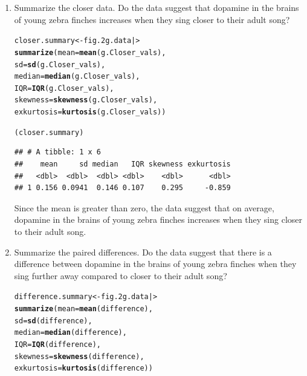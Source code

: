 \documentclass{article}\usepackage[]{graphicx}\usepackage[]{xcolor}
\makeatletter
\newcommand{\hldef}[1]{\textcolor[rgb]{0.345,0.345,0.345}{#1}}%
\newcommand{\hlkwb}[1]{\textcolor[rgb]{0.69,0.353,0.396}{#1}}%
\newcommand{\hlkwc}[1]{\textcolor[rgb]{0.333,0.667,0.333}{#1}}%
\newcommand{\hlkwd}[1]{\textcolor[rgb]{0.737,0.353,0.396}{\textbf{#1}}}%
\newenvironment{kframe}{%
 \def\at@end@of@kframe{}%
 \ifinner\ifhmode%
  \def\at@end@of@kframe{\end{minipage}}%
  \begin{minipage}{\columnwidth}%
 \fi\fi%
 \def\FrameCommand##1{\hskip\@totalleftmargin \hskip-\fboxsep
 \colorbox{shadecolor}{##1}\hskip-\fboxsep
     \hskip-\linewidth \hskip-\@totalleftmargin \hskip\columnwidth}%
 \MakeFramed {\advance\hsize-\width
   \@totalleftmargin\z@ \linewidth\hsize
   \@setminipage}}%
 {\par\unskip\endMakeFramed%
 \at@end@of@kframe}
\newenvironment{knitrout}{}{} %
\makeatother
\begin{document}
\begin{enumerate}
\begin{enumerate}
   \item Summarize the closer data. Do the data suggest that
   dopamine in the brains of young zebra finches increases when
   they sing closer to their adult song?

\begin{knitrout}\scriptsize
{}\color{fgcolor}\begin{kframe}
\begin{alltt}
\hldef{closer.summary} \hlkwb{<-} \hldef{fig.2g.data |>}
  \hlkwd{summarize}\hldef{(}\hlkwc{mean}       \hldef{=} \hlkwd{mean}\hldef{(g.Closer_vals),}
            \hlkwc{sd}         \hldef{=} \hlkwd{sd}\hldef{(g.Closer_vals),}
            \hlkwc{median}     \hldef{=} \hlkwd{median}\hldef{(g.Closer_vals),}
            \hlkwc{IQR}        \hldef{=} \hlkwd{IQR}\hldef{(g.Closer_vals),}
            \hlkwc{skewness}   \hldef{=} \hlkwd{skewness}\hldef{(g.Closer_vals),}
            \hlkwc{exkurtosis} \hldef{=} \hlkwd{kurtosis}\hldef{(g.Closer_vals))}

\hldef{(closer.summary)}
\end{alltt}
\begin{verbatim}
## # A tibble: 1 x 6
##    mean     sd median   IQR skewness exkurtosis
##   <dbl>  <dbl>  <dbl> <dbl>    <dbl>      <dbl>
## 1 0.156 0.0941  0.146 0.107    0.295     -0.859
\end{verbatim}
\end{kframe}
\end{knitrout}
Since the mean is greater than zero, the data suggest that on average, dopamine in the brains of young zebra finches increases when they sing closer to their adult song.

  \item Summarize the paired differences. Do the data suggest
  that there is a difference between dopamine in the brains of
  young zebra finches when they sing further away compared to 
  closer to their adult song?

\begin{knitrout}\scriptsize
{}\color{fgcolor}\begin{kframe}
\begin{alltt}
\hldef{difference.summary} \hlkwb{<-} \hldef{fig.2g.data |>}
  \hlkwd{summarize}\hldef{(}\hlkwc{mean}       \hldef{=} \hlkwd{mean}\hldef{(difference),}
            \hlkwc{sd}         \hldef{=} \hlkwd{sd}\hldef{(difference),}
            \hlkwc{median}     \hldef{=} \hlkwd{median}\hldef{(difference),}
            \hlkwc{IQR}        \hldef{=} \hlkwd{IQR}\hldef{(difference),}
            \hlkwc{skewness}   \hldef{=} \hlkwd{skewness}\hldef{(difference),}
            \hlkwc{exkurtosis} \hldef{=} \hlkwd{kurtosis}\hldef{(difference))}


\end{alltt}
\end{kframe}
\end{knitrout}
\end{enumerate}
\end{enumerate}
\end{document}
